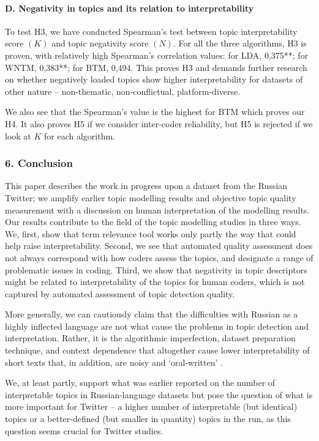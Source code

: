 \paragraph{D. Negativity in topics and its relation to interpretability}
To test H3, we have conducted Spearman’s test between topic interpretability score \((K)\) and topic negativity score \((N)\). For all the three algorithms, H3 is proven, with relatively high Spearman’s correlation values: for LDA, 0,375**; for WNTM, 0,383**; for BTM, 0,494. This proves H3 and demands further research on whether negatively loaded topics show higher interpretability for datasets of other nature -- non-thematic, non-conflictual, platform-diverse.

We also see that the Spearman’s value is the highest for BTM which proves our H4. It also proves H5 if we consider inter-coder reliability, but H5 is rejected if we look at \(K\) for each algorithm.

\subsubsection{6. Conclusion}

This paper describes the work in progress upon a dataset from the Russian Twitter; we amplify earlier topic modelling results and objective topic quality measurement with a discussion on human interpretation of the modelling results. Our results contribute to the field of the topic modelling studies in three ways. We, first, show that term relevance tool works only partly the way that could help raise interpretability. Second, we see that automated quality assessment does not always correspond with how coders assess the topics, and designate a range of problematic issues in coding. Third, we show that negativity in topic descriptors might be related to interpretability of the topics for human coders, which is not captured by automated assessment of topic detection quality.

More generally, we can cautiously claim that the difficulties with Russian as a highly inflected language are not what cause the problems in topic detection and interpretation. Rather, it is the algorithmic imperfection, dataset preparation technique, and context dependence that altogether cause lower interpretability of short texts that, in addition, are noisy and ‘oral-written’ \cite{Lutovinova}.

We, at least partly, support what was earlier reported on the number of interpretable topics in Russian-language datasets but pose the question of what is more important for Twitter -- a higher number of interpretable (but identical) topics or a better-defined (but smaller in quantity) topics in the run, as this question seems crucial for Twitter studies.

